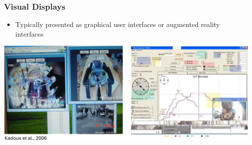 \documentclass[10pt]{article}
\begin{document}
\subsubsection*{Visual Displays}
\begin{itemize}
	\item Typically presented as graphical user interfaces or augmented reality interfaces
\end{itemize}
\begin{center} 
	\includegraphics*[width=\textwidth]{L1_3.png} 
\end{center}
\end{document}

